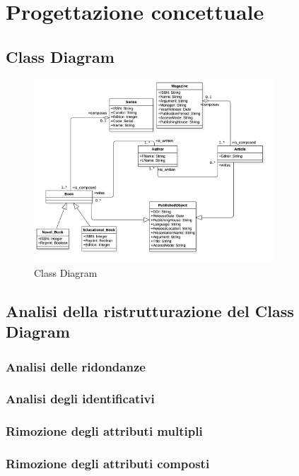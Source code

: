 \chapter{Progettazione concettuale}
		\section{Class Diagram}	
	\begin{figure}

	\centering
	\includegraphics[width=0.8\textwidth]{Immagini/ClassDiagram.png}
	\caption{Class Diagram}
	\label{fig:ClassDiagram}
	\end{figure}

    \section{Analisi della ristrutturazione del Class Diagram}
        
        \subsection{Analisi delle ridondanze}
            
        \subsection{Analisi degli identificativi}
            
        \subsection{Rimozione degli attributi multipli}
            
        \subsection{Rimozione degli attributi composti}
            
